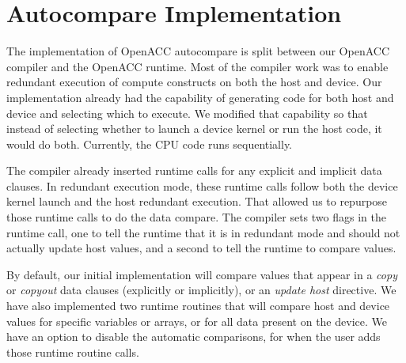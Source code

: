 \section{Autocompare Implementation}

The implementation of OpenACC autocompare is split between our OpenACC compiler and the OpenACC runtime.
Most of the compiler work was to enable redundant execution of compute constructs on both the host and device.
Our implementation already had the capability of generating code for both host and device and selecting which to execute.
We modified that capability so that instead of selecting whether to launch a device kernel or run the host code, it would do both.
Currently, the CPU code runs sequentially.

The compiler already inserted runtime calls for any explicit and implicit data clauses.
In redundant execution mode, these runtime calls follow both the device kernel launch and the host redundant execution.
That allowed us to repurpose those runtime calls to do the data compare.
The compiler sets two flags in the runtime call, one to tell the runtime that it is in redundant mode and should not actually update host values, and a second to tell the runtime to compare values.

By default, our initial implementation will compare values that appear in a \emph{copy} or \emph{copyout} data clauses (explicitly or implicitly), or an \emph{update host} directive.
We have also implemented two runtime routines that will compare host and device values for specific variables or arrays, or for all data present on the device.
We have an option to disable the automatic comparisons, for when the user adds those runtime routine calls.



